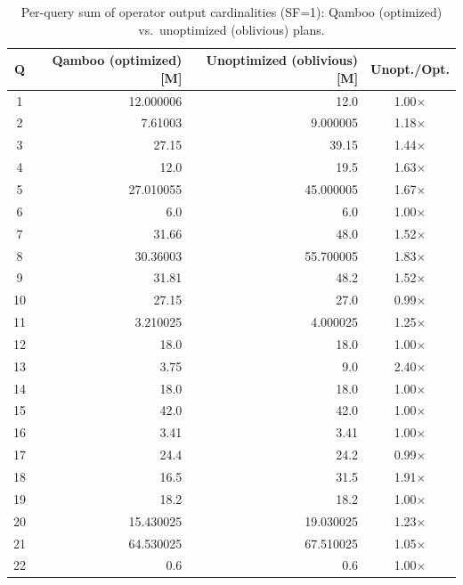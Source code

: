 \begin{table}[t]
  \centering
  \caption{Per-query sum of operator output cardinalities (SF=1): Qamboo (optimized) vs.\ unoptimized (oblivious) plans.}
  \label{tab:tpch-cardinality-sf1}
  \begin{tabular}{c r r c}
    \toprule
    Q & Qamboo (optimized) [M] & Unoptimized (oblivious) [M] & Unopt./Opt. \\
    \midrule
    1  & 12.000006 & 12.0      & 1.00$\times$ \\
    2  & 7.61003   & 9.000005  & 1.18$\times$ \\
    3  & 27.15     & 39.15     & 1.44$\times$ \\
    4  & 12.0      & 19.5      & 1.63$\times$ \\
    5  & 27.010055 & 45.000005 & 1.67$\times$ \\
    6  & 6.0       & 6.0       & 1.00$\times$ \\
    7  & 31.66     & 48.0      & 1.52$\times$ \\
    8  & 30.36003  & 55.700005 & 1.83$\times$ \\
    9  & 31.81     & 48.2      & 1.52$\times$ \\
    10 & 27.15     & 27.0      & 0.99$\times$ \\
    11 & 3.210025  & 4.000025  & 1.25$\times$ \\
    12 & 18.0      & 18.0      & 1.00$\times$ \\
    13 & 3.75      & 9.0       & 2.40$\times$ \\
    14 & 18.0      & 18.0      & 1.00$\times$ \\
    15 & 42.0      & 42.0      & 1.00$\times$ \\
    16 & 3.41      & 3.41      & 1.00$\times$ \\
    17 & 24.4      & 24.2      & 0.99$\times$ \\
    18 & 16.5      & 31.5      & 1.91$\times$ \\
    19 & 18.2      & 18.2      & 1.00$\times$ \\
    20 & 15.430025 & 19.030025 & 1.23$\times$ \\
    21 & 64.530025 & 67.510025 & 1.05$\times$ \\
    22 & 0.6       & 0.6       & 1.00$\times$ \\
    \bottomrule
  \end{tabular}
\end{table}
